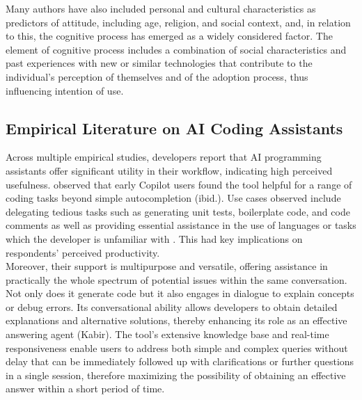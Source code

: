 Many authors have also included personal and cultural characteristics as predictors of attitude, including age, religion, and social context, and, in relation to this, the cognitive process has emerged as a widely considered factor. The element of cognitive process includes a combination of social characteristics and past experiences with new or similar technologies that contribute to the individual's perception of themselves and of the adoption process, thus influencing intention of use. 

\subsection{Empirical Literature on AI Coding Assistants}

Across multiple empirical studies, developers report that AI programming assistants offer significant utility in their workflow, indicating high perceived usefulness. \textcite{bird_taking_2023} observed that early Copilot users found the tool helpful for a range of coding tasks beyond simple autocompletion (ibid.). Use cases observed include delegating tedious tasks such as generating unit tests, boilerplate code, and code comments as well as providing essential assistance in the use of languages or tasks which the developer is unfamiliar with \parencite{bird_taking_2023, sergeyuk_using_2025}. This had key implications on respondents' perceived productivity. \\

Moreover, their support is multipurpose and versatile, offering assistance in practically the whole spectrum of potential issues within the same conversation. Not only does it generate code but it also engages in dialogue to explain concepts or debug errors. Its conversational ability allows developers to obtain detailed explanations and alternative solutions, thereby enhancing its role as an effective answering agent (Kabir). The tool’s extensive knowledge base and real-time responsiveness enable users to address both simple and complex queries without delay  that can be immediately followed up with clarifications or further questions in a single session, therefore maximizing the possibility of obtaining an effective answer within a short period of time. \\


